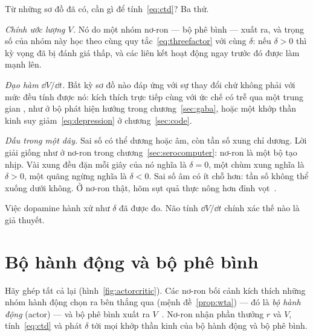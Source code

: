Từ những sơ đồ đã có, cần gì để tính~\eqref{eq:ctd}? Ba thứ.

\emph{Chính ước lượng $V$.} Nó do một nhóm nơ-ron  --- bộ phê bình --- xuất ra, và trọng số của nhóm này học theo cùng quy tắc~\eqref{eq:threefactor} với cùng $\delta$: nếu $\delta>0$ thì kỳ vọng đã bị đánh giá thấp, và các liên kết hoạt động ngay trước đó được làm mạnh lên.

\emph{Đạo hàm $\dd V/\dd t$.} Bất kỳ sơ đồ nào đáp ứng với sự thay đổi chứ không phải với mức đều tính được nó: kích thích trực tiếp cùng với ức chế có trễ qua một trung gian , như ở bộ phát hiện hướng trong chương~\ref{sec:gaba}, hoặc một khớp thần kinh suy giảm~\eqref{eq:depression} ở chương~\ref{sec:code}.

\emph{Dấu trong một dây.} Sai số có thể dương hoặc âm, còn tần số xung chỉ dương. Lời giải giống như ở nơ-ron  trong chương~\ref{sec:serocomputer}: nơ-ron  là một bộ tạo nhịp. Vài xung đều đặn mỗi giây của nó nghĩa là $\delta=0$, một chùm xung nghĩa là $\delta>0$, một quãng ngừng nghĩa là $\delta<0$. Sai số âm có ít chỗ hơn: tần số không thể xuống dưới không. Ở nơ-ron  thật, hõm sụt quả thực nông hơn đỉnh vọt~\cite{Bayer2005}.

Việc dopamine hành xử như $\delta$ đã được đo. Não tính $\dd V/\dd t$ chính xác thế nào là giả thuyết.

\section{Bộ hành động và bộ phê bình}

Hãy ghép tất cả lại (hình~\ref{fig:actorcritic}). Các nơ-ron bối cảnh kích thích những nhóm hành động chọn ra bên thắng qua  (mệnh đề~\ref{prop:wta}) --- đó là \emph{bộ hành động} (actor) --- và bộ phê bình xuất ra $V$~\cite{SuttonBarto2018}. Nơ-ron  nhận phần thưởng $r$ và $V$, tính~\eqref{eq:ctd} và phát $\delta$ tới mọi khớp thần kinh của bộ hành động và bộ phê bình.

